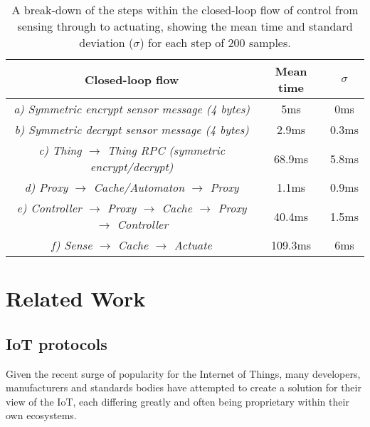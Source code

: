 \documentclass{mpaper}
\begin{document}
\begin{table*}[h!] %
  \begin{center} 
  \begin{tabular}{|c|c|c|} 
  \hline
    \textbf{Closed-loop flow}                               & \textbf{Mean time} & \textbf{$\sigma$} \\ \hline
    \textit{a) Symmetric encrypt sensor message (4 bytes)} & 5ms                & 0ms                 \\ \hline
    \textit{b) Symmetric decrypt sensor message (4 bytes)} & 2.9ms              & 0.3ms               \\ \hline
    \textit{c) Thing $\to$ Thing RPC (symmetric encrypt/decrypt)} & 68.9ms          & 5.8ms               \\ \hline
    \textit{d) Proxy $\to$ Cache/Automaton $\to$ Proxy}           & 1.1ms              & 0.9ms               \\ \hline
    \textit{e) Controller $\to$ Proxy $\to$ Cache $\to$ Proxy $\to$ Controller}& 40.4ms      & 1.5ms               \\ \hline
    \textit{f) Sense $\to$ Cache $\to$ Actuate}& 109.3ms                             & 6ms               \\ \hline
  \end{tabular}
  \caption[Table]{A break-down of the steps within the closed-loop flow of control from sensing through to actuating, showing the mean time and standard deviation ($\sigma$) for each step of 200 samples.}
  \label{tab:performance}
  \end{center}
\end{table*}


\section{Related Work} %
\label{sec:related_work}
\subsection{IoT protocols} %
\label{sub:iot_protocols}
Given the recent surge of popularity for the Internet of Things, many developers, manufacturers and standards bodies have attempted to create a solution for their view of the IoT, each differing greatly and often being proprietary within their own ecosystems. 
\end{document}
